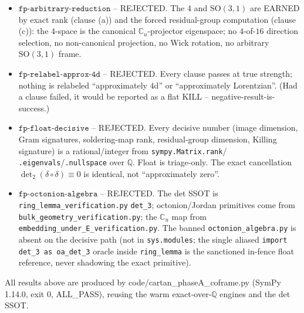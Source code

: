 \begin{itemize}
  \item $\mathtt{fp\text{-}arbitrary\text{-}reduction}$ -- REJECTED. The $4$ and
    $\mathrm{SO}(3,1)$ are EARNED by exact rank (clause (a)) and the forced
    residual-group computation (clause (c)): the $4$-space is the canonical
    $\mathbb{C}_u$-projector eigenspace; no $4$-of-$16$ direction selection, no
    non-canonical projection, no Wick rotation, no arbitrary $\mathrm{SO}(3,1)$ frame.
  \item $\mathtt{fp\text{-}relabel\text{-}approx\text{-}4d}$ -- REJECTED. Every clause
    passes at true strength; nothing is relabeled ``approximately $4$d'' or
    ``approximately Lorentzian''. (Had a clause failed, it would be reported as a flat
    KILL -- negative-result-is-success.)
  \item $\mathtt{fp\text{-}float\text{-}decisive}$ -- REJECTED. Every decisive number
    (image dimension, Gram signatures, soldering-map rank, residual-group dimension,
    Killing signature) is a rational/integer from \texttt{sympy.Matrix.rank}/
    \texttt{.eigenvals}/\texttt{.nullspace} over $\mathbb{Q}$. Float is triage-only.
    The exact cancellation $\det_2(\delta\circ\delta)\equiv 0$ is identical, not
    ``approximately zero''.
  \item $\mathtt{fp\text{-}octonion\text{-}algebra}$ -- REJECTED. The det SSOT is
    \texttt{ring\_lemma\_verification.py} \texttt{det\_3}; octonion/Jordan primitives
    come from \texttt{bulk\_geometry\_verification.py}; the $\mathbb{C}_u$ map from
    \texttt{embedding\_under\_E\_verification.py}. The banned \texttt{octonion\_algebra.py}
    is absent on the decisive path (not in \texttt{sys.modules}; the single aliased
    \texttt{import det\_3 as oa\_det\_3} oracle inside \texttt{ring\_lemma} is the
    sanctioned in-fence float reference, never shadowing the exact primitive).
\end{itemize}

All results above are produced by code/cartan\_phaseA\_coframe.py (SymPy 1.14.0,
exit 0, ALL\_PASS), reusing the warm exact-over-$\mathbb{Q}$ engines and the det SSOT.
